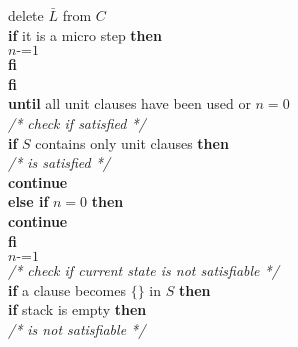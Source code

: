 \begin{listing}[h!]
                    \hspace*{2cm} delete $\bar{L}$ from $C$\\
                    \hspace*{2cm} \textbf{if} it is a micro step \textbf{then}\\
                        \hspace*{2.5cm} $n \texttt{-=} 1$\\
                    \hspace*{2cm} \textbf{fi}\\
                \hspace*{1.5cm} \textbf{fi}\\
            \hspace*{1.0cm} \textbf{until} all unit clauses have been used or $n = 0$\\
            \hspace*{1.0cm} \textit{/* check if satisfied */}\\
            \hspace*{1.0cm} \textbf{if} $S$ contains only unit clauses \textbf{then}\\
                \hspace*{1.5cm} \textit{/* is satisfied */}\\
                \hspace*{1.5cm} \textbf{continue}\\
            \hspace*{1.0cm} \textbf{else if} $n = 0$ \textbf{then}\\
                \hspace*{1.5cm} \textbf{continue}\\
            \hspace*{1.0cm} \textbf{fi}\\
            \hspace*{1.0cm} $n \texttt{-=} 1$\\
            \hspace*{1.0cm} \textit{/* check if current state is not satisfiable */}\\
            \hspace*{1.0cm} \textbf{if} a clause becomes $\{\}$ in $S$ \textbf{then}\\
                \hspace*{1.5cm} \textbf{if} stack is empty \textbf{then}\\
                    \hspace*{2cm} \textit{/* is not satisfiable */}\\

\end{listing}
